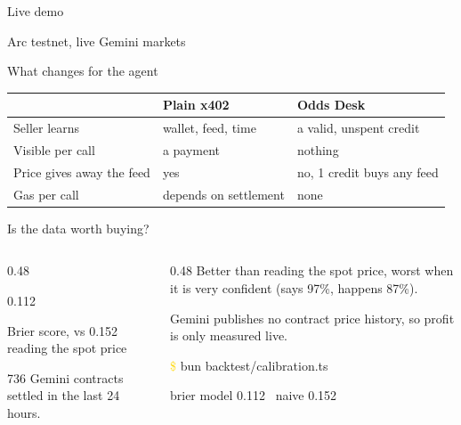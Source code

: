\documentclass[aspectratio=169,12pt]{beamer}
\begin{document}
\begin{frame}
  \centering
  \vfill
  {\pixel\fontsize{34}{38}\selectfont\color{sand} Live demo\par}
  \medskip
  {\ttfamily\textcolor{sky}{Arc testnet, live Gemini markets}}
  \vfill
\end{frame}

\begin{frame}{What changes for the agent}
  \vspace{0.5cm}
  \small
  \renewcommand{\arraystretch}{1.25}
  \begin{tabular}{@{}>{\raggedright\arraybackslash}p{3.1cm}>{\raggedright\arraybackslash}p{3.1cm}>{\raggedright\arraybackslash}p{4.1cm}@{}}
    \toprule
    & \textcolor{sky}{Plain x402} & \textcolor{sand}{Odds Desk} \\
    \midrule
    Seller learns & wallet, feed, time & a valid, unspent credit \\
    Visible per call & a payment & nothing \\
    Price gives away the feed & yes & no, 1 credit buys any feed \\
    Gas per call & depends on settlement & none \\
    \bottomrule
  \end{tabular}
\end{frame}

\begin{frame}{Is the data worth buying?}
  \vspace{0.9cm}
  \begin{columns}[c,onlytextwidth]
    \begin{column}{0.48\textwidth}
      {\pixel\fontsize{48}{52}\selectfont\color{sand} 0.112\par}
      {\ttfamily\textcolor{sky}{Brier score, vs 0.152 reading the spot price}}
      \bigskip

      736 Gemini contracts settled in the last 24 hours.
    \end{column}
    \begin{column}{0.48\textwidth}
      \small
      Better than reading the spot price, worst when it is very confident (says 97\%, happens 87\%).
      \medskip

      Gemini publishes no contract price history, so profit is only measured live.
      \medskip

      \begin{term}
        \textcolor{gold}{\$} bun backtest/calibration.ts\par
        brier model 0.112 \ naive 0.152
      \end{term}
    \end{column}
  \end{columns}
\end{frame}
\end{document}
